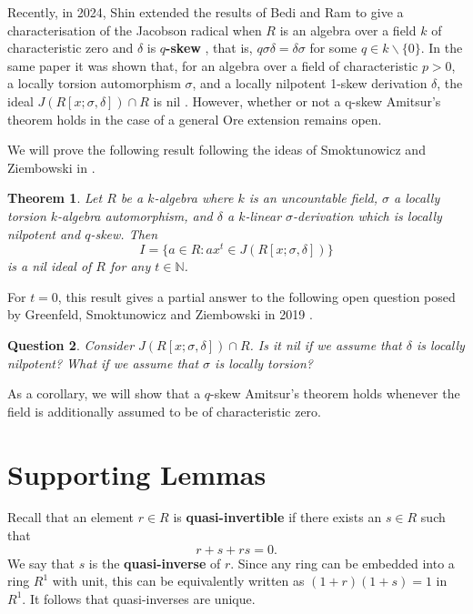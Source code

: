 \documentclass[12pt]{amsart}
\newtheorem{thm}{Theorem}
\newtheorem{question}[thm]{Question}
\theoremstyle{definition}
\theoremstyle{definition}
\theoremstyle{definition}
\theoremstyle{remark}
\theoremstyle{definition}
\begin{document}
Recently, in 2024, Shin extended the results of Bedi and Ram to give a characterisation of the Jacobson radical when $R$ is an algebra over a field $k$ of characteristic zero and $\delta$ is \textbf{$q$-skew} \cite[Theorem 1]{shin2024jacobsonradicalsoreextensions}, that is, $q\sigma\delta = \delta\sigma$ for some $q \in k\backslash \{0\}$. In the same paper it was shown that, for an algebra over a field of characteristic $p>0$, a locally torsion automorphism $\sigma$, and a locally nilpotent 1-skew derivation $\delta$, the ideal $J(R[x;\sigma,\delta])\cap R$ is nil \cite[Theorem 3]{shin2024jacobsonradicalsoreextensions}. However, whether or not a q-skew Amitsur's theorem holds in the case of a general Ore extension remains open. 
    
We will prove the following result following the ideas of Smoktunowicz and Ziembowski in \cite[Proposition 2.1]{SMOKTUNOWICZuncountablefield}.

\begin{thm}
\label{theorem}
    Let $R$ be a $k$-algebra where $k$ is an uncountable field, $\sigma$ a locally torsion $k$-algebra automorphism, and $\delta$ a $k$-linear $\sigma$-derivation which is locally nilpotent and $q$-skew. Then $$I = \{a\in R:ax^{t}\in J(R[x;\sigma,\delta])\}$$ is a nil ideal of $R$ for any $t \in \mathbb{N}$.
\end{thm}

For $t = 0$, this result gives a partial answer to the following open question posed by Greenfeld, Smoktunowicz and Ziembowski in 2019 \cite{GreenfieldSmoktunowiczZiembowski}. 

\begin{question}\cite[Question 6.17]{GreenfieldSmoktunowiczZiembowski}
    Consider $J(R[x;\sigma,\delta]) \cap R$. Is it nil if we assume that $\delta$ is locally nilpotent? What if we assume that $\sigma$ is locally torsion?
\end{question}

As a corollary, we will show that a $q$-skew Amitsur's theorem holds whenever the field is additionally assumed to be of characteristic zero.

\section{Supporting Lemmas}

Recall that an element $r\in R$ is \textbf{quasi-invertible} if there exists an $s \in R$ such that \[
        r+s+rs = 0.
    \]We say that $s$ is the \textbf{quasi-inverse} of $r$. Since any ring can be embedded into a ring $R^1$ with unit, this can be equivalently written as $(1+r)(1+s) =1$ in $R^1$. It follows that quasi-inverses are unique.
\end{document}
